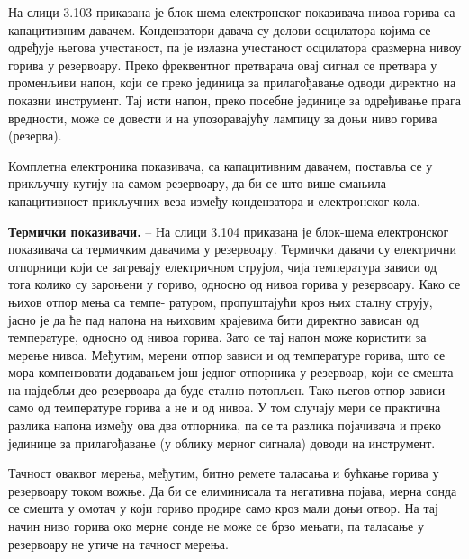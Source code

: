 \documentclass[12pt,a4paper]{report}
\begin{document}
На слици 3.103 приказана је блок-шема електронског показивача нивоа горива са капацитивним давачем. Кондензатори давача су делови осцилатора којима се одређује његова учестаност, па је излазна учестаност осцилатора сразмерна нивоу горива у резервоару. Преко фреквентног претварача овај сигнал се претвара у променљиви напон, који се преко јединица за прилагођавање одводи директно на показни инструмент. Тај исти напон, преко посебне јединице за одређивање прага вредности, може се довести и на упозоравајућу лампицу за доњи ниво горива (резерва).

Комплетна електроника показивача, са капацитивним давачем, поставља се у прикључну кутију на самом резервоару, да би се што више смањила капацитивност прикључних веза између кондензатора и електронског кола.

\textbf{Термички показивачи.} – На слици 3.104 приказана је блок-шема електронског показивача са термичким давачима у резервоару. Термички давачи су електрични отпорници који се загревају електричном струјом, чија температура зависи од тога колико су зароњени у гориво, односно од нивоа горива у резервоару. Како се њихов отпор мења са темпе-%
%
ратуром, пропуштајући кроз њих сталну струју, јасно је да ће пад напона на њиховим крајевима бити директно зависан од температуре, односно од нивоа горива. Зато се тај напон може користити за мерење нивоа. Међутим, мерени отпор зависи и од температуре горива, што се мора компензовати додавањем још једног отпорника у резервоар, који се смешта на најдебљи део резервоара да буде стално потопљен. Тако његов отпор зависи само од температуре горива а не и од нивоа. У том случају мери се практична разлика напона између ова два отпорника, па се та разлика појачивача и преко јединице за прилагођавање (у облику мерног сигнала) доводи на инструмент.

Тачност оваквог мерења, међутим, битно ремете таласања и бућкање горива у резервоару током вожње. Да би се елиминисала та негативна појава, мерна сонда се смешта у омотач у који гориво продире само кроз мали доњи отвор. На тај начин ниво горива око мерне сонде не може се брзо мењати, па таласање у резервоару не утиче на тачност мерења.
\end{document}
